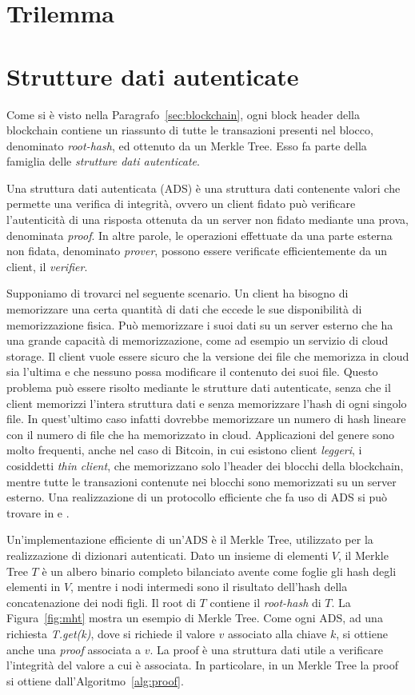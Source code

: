 \section{Trilemma}

\section{Strutture dati autenticate}

Come si è visto nella Paragrafo~\ref{sec:blockchain}, ogni block header della blockchain contiene un riassunto di tutte le transazioni presenti nel blocco, denominato \emph{root-hash}, ed ottenuto da un Merkle Tree. Esso fa parte della famiglia delle \emph{strutture dati autenticate}.

Una struttura dati autenticata (ADS) è una struttura dati contenente valori che permette una verifica di integrità, ovvero un client fidato può verificare l'autenticità di una risposta ottenuta da un server non fidato mediante una prova, denominata \emph{proof}. In altre parole, le operazioni effettuate da una parte esterna non fidata, denominato \emph{prover}, possono essere verificate efficientemente da un client, il \emph{verifier}.

Supponiamo di trovarci nel seguente scenario. Un client ha bisogno di memorizzare una certa quantità di dati che eccede le sue disponibilità di memorizzazione fisica. Può memorizzare i suoi dati su un server esterno che ha una grande capacità di memorizzazione, come ad esempio un servizio di cloud storage. Il client vuole essere sicuro che la versione dei file che memorizza in cloud sia l'ultima e che nessuno possa modificare il contenuto dei suoi file. Questo problema può essere risolto mediante le strutture dati autenticate, senza che il client memorizzi l'intera struttura dati e senza memorizzare l'hash di ogni singolo file. In quest'ultimo caso infatti dovrebbe memorizzare un numero di hash lineare con il numero di file che ha memorizzato in cloud. Applicazioni del genere sono molto frequenti, anche nel caso di Bitcoin, in cui esistono client \emph{leggeri}, i cosiddetti \emph{thin client}, che memorizzano solo l'header dei blocchi della blockchain, mentre tutte le transazioni contenute nei blocchi sono memorizzati su un server esterno. Una realizzazione di un protocollo efficiente che fa uso di ADS si può trovare in \cite{pennino2019pipeline} e \cite{gdm}.

Un'implementazione efficiente di un'ADS è il Merkle Tree, utilizzato per la realizzazione di dizionari autenticati. Dato un insieme di elementi $V$, il Merkle Tree $T$ è un albero binario completo bilanciato avente come foglie gli hash degli elementi in $V$, mentre i nodi intermedi sono il risultato dell'hash della concatenazione dei nodi figli. Il root di $T$ contiene il \emph{root-hash} di $T$. La Figura~\ref{fig:mht} mostra un esempio di Merkle Tree.
Come ogni ADS, ad una richiesta \emph{T.get(k)}, dove si richiede il valore $v$ associato alla chiave $k$, si ottiene anche una \emph{proof} associata a $v$. La proof è una struttura dati utile a verificare l'integrità del valore a cui è associata. In particolare, in un Merkle Tree la proof si ottiene dall'Algoritmo~\ref{alg:proof}.

